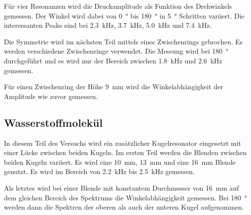 Für vier Resonanzen wird die Druckamplitude als Funktion des Drehwinkels gemessen. Der Winkel wird dabei von \SI{0}{\degree} bis \SI{180}{\degree} in \SI{5}{\degree} Schritten variiert. Die interessanten Peaks sind bei \SI{2.3}{\kilo\hertz}, \SI{3.7}{\kilo\hertz}, \SI{5.0}{\kilo\hertz} und \SI{7.4}{\kilo\hertz}.

Die Symmetrie wird im nächsten Teil mittels eines Zwischenrings gebrochen. Es werden verschiedene Zwischenringe verwendet. Die Messung wird bei \SI{180}{\degree} durchgeführt und es wird nur der Bereich zwischen \SI{1.8}{\kilo\hertz} und \SI{2.6}{\kilo\hertz} gemessen. 

Für einen Zwischenring der Höhe \SI{9}{\milli\metre} wird die Winkelabhängigkeit der Amplitude wie zuvor gemessen. 

\subsection{Wasserstoffmolekül}

In diesem Teil des Versuchs wird ein zusätzlicher Kugelresonator eingesetzt mit einer Lücke zwischen beiden Kugeln. 
Im ersten Teil werden die Blenden zwischen beiden Kugeln variiert. Es wird eine \SI{10}{\milli\metre}, \SI{13}{\milli\metre} und eine \SI{16}{\milli\metre} Blende genutzt. Es wird im Bereich von \SI{2.2}{\kilo\hertz} bis \SI{2.5}{\kilo\hertz} gemessen. 

Als letztes wird bei einer Blende mit konstantem Durchmesser von \SI{16}{\milli\metre} auf dem gleichen Bereich des Spektrums die Winkelabhängigkeit gemessen. 
Bei \SI{180}{\degree} werden dann die Spektren der oberen als auch der unteren Kugel aufgenommen. 

